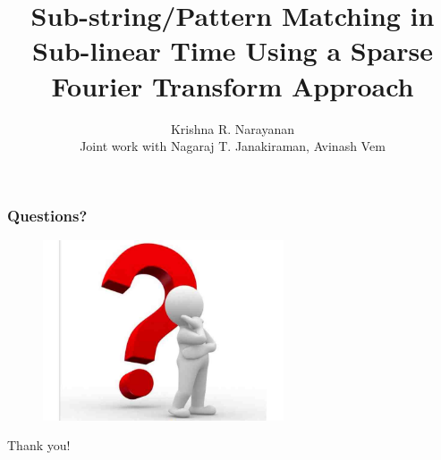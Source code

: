 \documentclass[10pt,xcolor=table]{beamer}
\begin{document}
\title{Sub-string/Pattern Matching in Sub-linear Time Using a Sparse Fourier Transform Approach}
\author{ Krishna R. Narayanan \\
Joint work with Nagaraj T. Janakiraman, Avinash Vem \\
}
\date{}
\frame{\titlepage}

%




%		


\begin{frame}\frametitle{Questions?}
	\begin{figure}[t]
		\centering
		\includegraphics[width=2.8in]{questions}
	\end{figure}
	\centering
	\color{blue}
	\Huge{Thank you!}
\end{frame}
\end{document}
